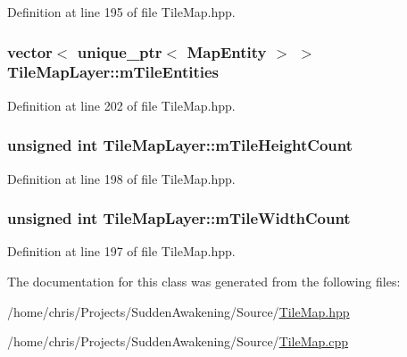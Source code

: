 Definition at line 195 of file Tile\-Map.\-hpp.

\hypertarget{class_tile_map_layer_a9c9c569f4c2f5de09b5541d079f5f97a}{
\subsubsection[{m\-Tile\-Entities}]{\setlength{\rightskip}{0pt plus 5cm}vector$<$ unique\-\_\-ptr$<$ {\bf Map\-Entity} $>$ $>$ Tile\-Map\-Layer\-::m\-Tile\-Entities\hspace{0.3cm}{\ttfamily [protected]}}}\label{class_tile_map_layer_a9c9c569f4c2f5de09b5541d079f5f97a}


Definition at line 202 of file Tile\-Map.\-hpp.

\hypertarget{class_tile_map_layer_ad3731c3f3e38579327eb1a6b40e74af3}{
\subsubsection[{m\-Tile\-Height\-Count}]{\setlength{\rightskip}{0pt plus 5cm}unsigned int Tile\-Map\-Layer\-::m\-Tile\-Height\-Count\hspace{0.3cm}{\ttfamily [protected]}}}\label{class_tile_map_layer_ad3731c3f3e38579327eb1a6b40e74af3}


Definition at line 198 of file Tile\-Map.\-hpp.

\hypertarget{class_tile_map_layer_a1f7ed47471eae14e321db6e2da4d0547}{
\subsubsection[{m\-Tile\-Width\-Count}]{\setlength{\rightskip}{0pt plus 5cm}unsigned int Tile\-Map\-Layer\-::m\-Tile\-Width\-Count\hspace{0.3cm}{\ttfamily [protected]}}}\label{class_tile_map_layer_a1f7ed47471eae14e321db6e2da4d0547}


Definition at line 197 of file Tile\-Map.\-hpp.



The documentation for this class was generated from the following files\-:\begin{DoxyCompactItemize}
\item 
/home/chris/\-Projects/\-Sudden\-Awakening/\-Source/\hyperlink{_tile_map_8hpp}{Tile\-Map.\-hpp}\item 
/home/chris/\-Projects/\-Sudden\-Awakening/\-Source/\hyperlink{_tile_map_8cpp}{Tile\-Map.\-cpp}\end{DoxyCompactItemize}
